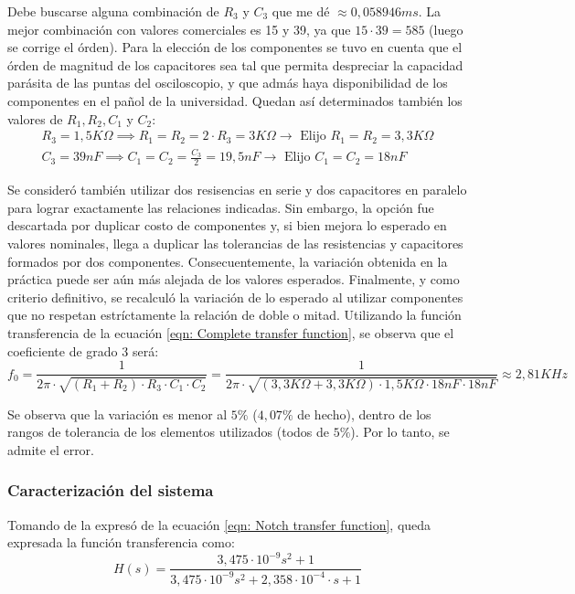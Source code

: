 Debe buscarse alguna combinaci\'on de $R_3$ y $C_3$ que me d\'e $\approx 0,058946 ms$.
La mejor combinaci\'on con valores comerciales es 15 y 39, ya que $15 \cdot 39 = 585$ (luego se corrige el \'orden).
Para la elecci\'on de los componentes se tuvo en cuenta que el \'orden de magnitud de los capacitores sea tal que permita despreciar la capacidad par\'asita de las puntas del osciloscopio, y que adm\'as haya disponibilidad de los componentes en el pa\~nol de la universidad.
Quedan as\'i determinados tambi\'en los valores de $R_1, R_2, C_1$ y $C_2$:
\begin{align}
	\label{eqn: Selection of components}
    R_3 = 1,5 K\Omega \implies R_1 = R_2 = 2 \cdot R_3 = 3 K\Omega \longrightarrow \textrm{ Elijo  } R_1 = R_2 = 3,3 K\Omega \\
    C_3 = 39 nF \implies C_1 = C_2 = \frac{C_3}{2} = 19,5 nF \longrightarrow \textrm{ Elijo  } C_1 = C_2 = 18 nF
\end{align}

Se consider\'o tambi\'en utilizar dos resisencias en serie y dos capacitores en paralelo para lograr exactamente las relaciones indicadas.
Sin embargo, la opci\'on fue descartada por duplicar costo de componentes y, si bien mejora lo esperado en valores nominales, llega a duplicar las tolerancias de las resistencias y capacitores formados por dos componentes.
Consecuentemente, la variaci\'on obtenida en la pr\'actica puede ser a\'un m\'as alejada de los valores esperados.
Finalmente, y como criterio definitivo, se recalcul\'o la variaci\'on de lo esperado al utilizar componentes que no respetan estr\'ictamente la relaci\'on de doble o mitad.
Utilizando la funci\'on transferencia de la ecuaci\'on \ref{eqn: Complete transfer function}, se observa que el coeficiente de grado 3 ser\'a:
\begin{equation}
    f_0 = \frac{1}{2\pi \cdot \sqrt{\left(R_1 + R_2\right) \cdot R_3 \cdot C_1 \cdot C_2}} = \frac{1}{2\pi \cdot \sqrt{\left(3,3 K\Omega + 3,3 K\Omega\right) \cdot 1,5 K\Omega \cdot 18 nF \cdot 18nF}} \approx 2,81 KHz
\end{equation}

Se observa que la variaci\'on es menor al $5\%$ ($4,07\%$ de hecho), dentro de los rangos de tolerancia de los elementos utilizados (todos de $5\%$).
Por lo tanto, se admite el error.



\subsubsection{Caracterizaci\'on del sistema}
Tomando de la expres\'o de la ecuaci\'on \ref{eqn: Notch transfer function}, queda expresada la funci\'on transferencia como:
\begin{equation}
    \label{eqn: Theoretical transfer function with numbers}
    H(s) = \frac{3,475 \cdot 10^{-9} s^2 + 1}{3,475 \cdot 10^{-9} s^2 + 2,358 \cdot 10^{-4} \cdot s + 1}
\end{equation}

